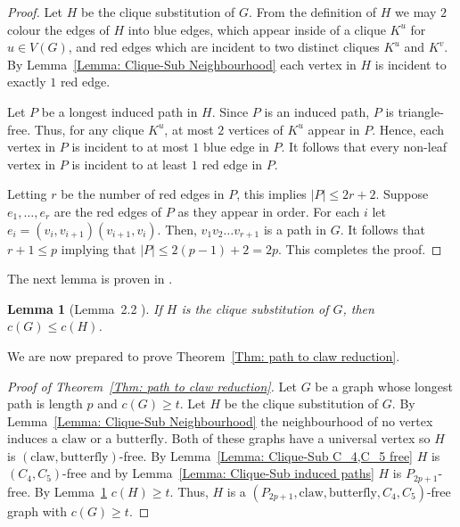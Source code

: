 \documentclass[12pt]{article}
\newtheorem{lemma}[theorem]{Lemma}
\theoremstyle{definition}
\def\claw{\text{claw}}
\def\butterfly{\text{butterfly}}
\begin{document}
\begin{proof}
    Let $H$ be the clique substitution  of $G$.
    From the definition of $H$ we may $2$ colour the edges of $H$ into blue edges, which appear inside of a clique $K^u$ 
    for $u \in V(G)$, and red edges which are incident to two distinct cliques $K^u$ and $K^v$.
    By Lemma~\ref{Lemma: Clique-Sub Neighbourhood} each vertex in $H$ is incident to exactly $1$ red edge.

    Let $P$ be a longest induced path in $H$.
    Since $P$ is an induced path, $P$ is triangle-free.
    Thus, for any clique $K^u$, at most $2$ vertices of $K^u$ appear in $P$.
    Hence, each vertex in $P$ is incident to at most $1$ blue edge in $P$.
    It follows that every non-leaf vertex in $P$ is incident to at least $1$ red edge in $P$.

    Letting $r$ be the number of red edges in $P$, this implies $|P| \leq 2r+2$.
    Suppose $e_1,\dots, e_r$ are the red edges of $P$ as they appear in order.
    For each $i$ let $e_i = (v_{i},v_{i+1})(v_{i+1},v_i)$.
    Then, $v_1v_2\dots v_{r+1}$ is a path in $G$.
    It follows that $r+1 \leq p$ implying that $|P| \leq 2(p-1)+2 = 2p$.
    This completes the proof.
\end{proof}


The next lemma is proven in \cite{joret2010cops}. 


\begin{lemma}[Lemma~2.2 \cite{joret2010cops}]\label{Lemma: Clique-Sub cop num}
    If $H$ is the clique substitution  of $G$, then $c(G) \leq c(H)$.
\end{lemma}


We are now prepared to prove Theorem~\ref{Thm: path to claw reduction}.

\begin{proof}[Proof of Theorem~\ref{Thm: path to claw reduction}]
    Let $G$ be a graph whose longest path is length $p$ and $c(G) \geq t$.
    Let $H$ be the clique substitution of $G$.
    By Lemma~\ref{Lemma: Clique-Sub Neighbourhood} the neighbourhood of no vertex induces a $\claw$ or a $\butterfly$.
    Both of these graphs have a universal vertex so $H$ is $(\claw,\butterfly)$-free.
    By Lemma~\ref{Lemma: Clique-Sub C_4,C_5 free} $H$ is $(C_4,C_5)$-free and by Lemma~\ref{Lemma: Clique-Sub induced paths} $H$ is $P_{2p+1}$-free.
    By Lemma~\ref{Lemma: Clique-Sub cop num} $c(H) \geq t$.
    Thus, $H$ is a $(P_{2p+1},\claw,\butterfly,C_4,C_5)$-free graph with $c(G)\geq t$.
\end{proof}
\end{document}
